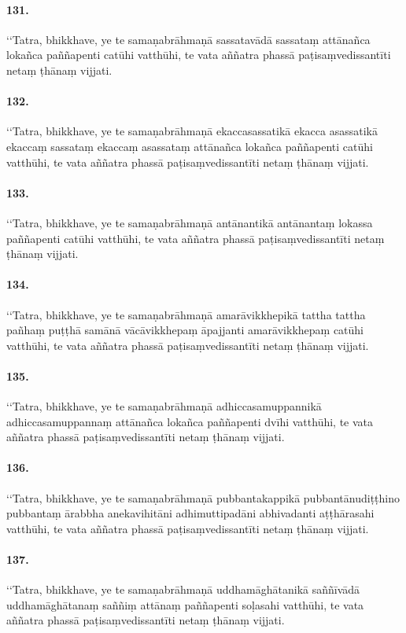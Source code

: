 \paragraph{131.}
‘‘Tatra, bhikkhave, ye te samaṇabrāhmaṇā sassatavādā sassataṃ attānañca lokañca paññapenti catūhi vatthūhi, te vata aññatra phassā paṭisaṃvedissantīti netaṃ ṭhānaṃ vijjati.

\paragraph{132.}
‘‘Tatra, bhikkhave, ye te samaṇabrāhmaṇā ekaccasassatikā ekacca asassatikā ekaccaṃ sassataṃ ekaccaṃ asassataṃ attānañca lokañca paññapenti catūhi vatthūhi, te vata aññatra phassā paṭisaṃvedissantīti netaṃ ṭhānaṃ vijjati.

\paragraph{133.}
‘‘Tatra, bhikkhave, ye te samaṇabrāhmaṇā antānantikā antānantaṃ lokassa paññapenti catūhi vatthūhi, te vata aññatra phassā paṭisaṃvedissantīti netaṃ ṭhānaṃ vijjati.

\paragraph{134.}
‘‘Tatra, bhikkhave, ye te samaṇabrāhmaṇā amarāvikkhepikā tattha tattha pañhaṃ puṭṭhā samānā vācāvikkhepaṃ āpajjanti amarāvikkhepaṃ catūhi vatthūhi, te vata aññatra phassā paṭisaṃvedissantīti netaṃ ṭhānaṃ vijjati.

\paragraph{135.}
‘‘Tatra, bhikkhave, ye te samaṇabrāhmaṇā adhiccasamuppannikā adhiccasamuppannaṃ attānañca lokañca paññapenti dvīhi vatthūhi, te vata aññatra phassā paṭisaṃvedissantīti netaṃ ṭhānaṃ vijjati.

\paragraph{136.}
‘‘Tatra, bhikkhave, ye te samaṇabrāhmaṇā pubbantakappikā pubbantānudiṭṭhino pubbantaṃ ārabbha anekavihitāni adhimuttipadāni abhivadanti aṭṭhārasahi vatthūhi, te vata aññatra phassā paṭisaṃvedissantīti netaṃ ṭhānaṃ vijjati.

\paragraph{137.}
‘‘Tatra, bhikkhave, ye te samaṇabrāhmaṇā uddhamāghātanikā saññīvādā uddhamāghātanaṃ saññiṃ attānaṃ paññapenti soḷasahi vatthūhi, te vata aññatra phassā paṭisaṃvedissantīti netaṃ ṭhānaṃ vijjati.

